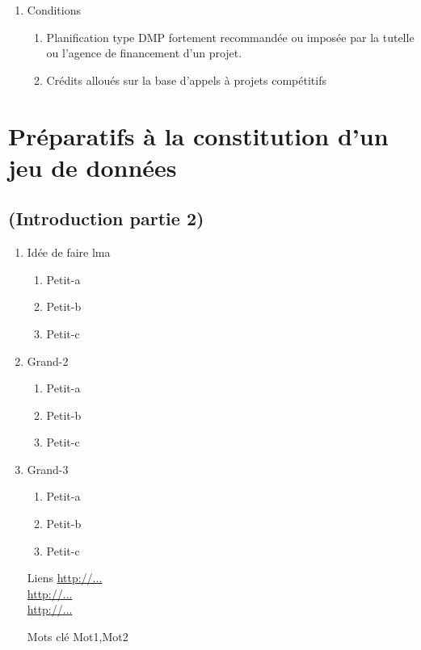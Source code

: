 \documentclass{book}
\begin{document}
\begin{enumerate}
	\item Conditions
	      \begin{enumerate}
	      	\item Planification type DMP fortement recommandée ou imposée par la tutelle ou l'agence de financement d'un projet.
            \item Crédits alloués sur la base d'appels à projets compétitifs
            
	      \end{enumerate}
\end{enumerate}

\chapter{Préparatifs à la constitution d'un jeu de données}

\section*{(Introduction partie 2)}

\begin{enumerate}
	\item Idée de faire lma 
        \begin{enumerate}
            \item Petit-a
            \item Petit-b
            \item Petit-c
        \end{enumerate}
	\item Grand-2
        \begin{enumerate}
            \item Petit-a
            \item Petit-b
            \item Petit-c
        \end{enumerate}
	\item Grand-3
        \begin{enumerate}
            \item Petit-a
            \item Petit-b
            \item Petit-c
        \end{enumerate}
\end{enumerate}

\begin{itemize}
    \item [Liens]
        \url{http://...}\\
        \url{http://...}\\
        \url{http://...}\\
    \item [Mots clé]
        \gls{Mot1},\gls{Mot2}
\end{itemize}
\end{document}
